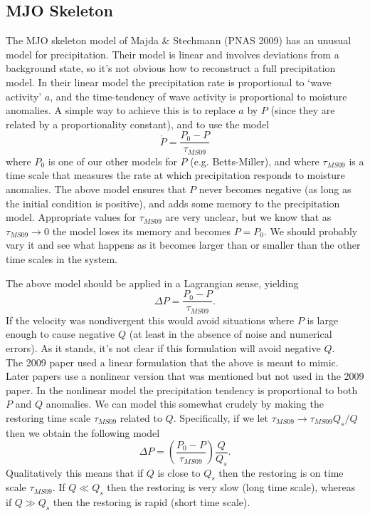 \documentclass[10pt]{article}
\begin{document}
\subsection{MJO Skeleton}
The MJO skeleton model of Majda \& Stechmann (PNAS 2009) has an unusual model for precipitation.
Their model is linear and involves deviations from a background state, so it's not obvious how to reconstruct a full precipitation model.
In their linear model the precipitation rate is proportional to `wave activity' $a$, and the time-tendency of wave activity is proportional to moisture anomalies.
A simple way to achieve this is to replace $a$ by $P$ (since they are related by a proportionality constant), and to use the model
\[\dot{P} = \frac{P_0-P}{\tau_{MS09}}\]
where $P_0$ is one of our other models for $P$ (e.g. Betts-Miller), and
where $\tau_{MS09}$ is a time scale that measures the rate at which precipitation responds to moisture anomalies.
The above model ensures that $P$ never becomes negative (as long as the initial condition is positive), and adds some memory to the precipitation model.
Appropriate values for $\tau_{MS09}$ are very unclear, but we know that as $\tau_{MS09}\to0$ the model loses its memory and becomes $P=P_0$.
We should probably vary it and see what happens as it becomes larger than or smaller than the other time scales in the system.

The above model should be applied in a Lagrangian sense, yielding
\[\Delta P = \frac{P_0-P}{\tau_{MS09}}.\]
If the velocity was nondivergent this would avoid situations where $P$ is large enough to cause negative $Q$ (at least in the absence of noise and numerical errors).
As it stands, it's not clear if this formulation will avoid negative $Q$.\\

The 2009 paper used a linear formulation that the above is meant to mimic. 
Later papers use a nonlinear version that was mentioned but not used in the 2009 paper.
In the nonlinear model the precipitation tendency is proportional to both $P$ and $Q$ anomalies.
We can model this somewhat crudely by making the restoring time scale $\tau_{MS09}$ related to $Q$.
Specifically, if we let $\tau_{MS09}\to \tau_{MS09}Q_s/Q$ then we obtain the following model
\[\Delta P = \left(\frac{P_0-P}{\tau_{MS09}}\right)\frac{Q}{Q_s}.\]
Qualitatively this means that if $Q$ is close to $Q_s$ then the restoring is on time scale $\tau_{MS09}$.
If $Q\ll Q_s$ then the restoring is very slow (long time scale), whereas if $Q\gg Q_s$ then the restoring is rapid (short time scale).
\end{document}
